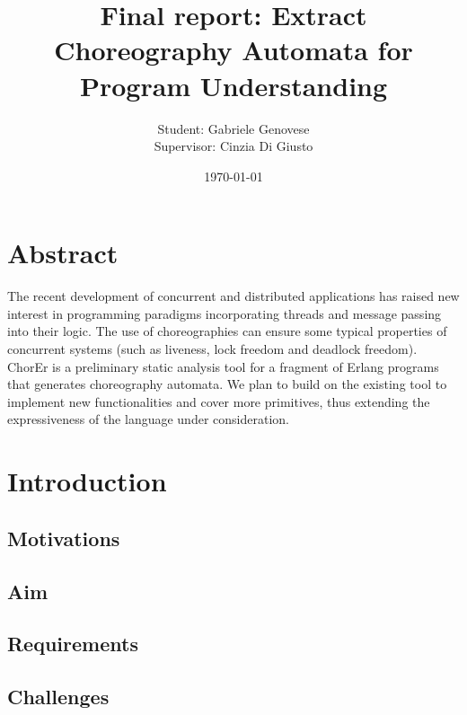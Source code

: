 \documentclass{article}
\title{Final report: Extract Choreography Automata for Program Understanding}
\author{Student: Gabriele Genovese\\Supervisor: Cinzia Di Giusto}
\date{\today}
\theoremstyle{definition}
\theoremstyle{definition}
\begin{document}
\maketitle


\section*{Abstract}
The recent development of concurrent and distributed applications has raised new interest in programming paradigms incorporating threads and message passing into their logic. The use of choreographies
can ensure some typical properties of concurrent systems (such as liveness, lock freedom and deadlock freedom). ChorEr is a preliminary static analysis tool for a fragment of Erlang programs that generates choreography automata. We plan to build on the existing tool to implement new functionalities and cover more primitives, thus extending the expressiveness of the language under consideration.

\newpage

\tableofcontents

\newpage

\section{Introduction}


\subsection{Motivations}


\subsection{Aim}


\subsection{Requirements}


\subsection{Challenges}


% 
\end{document}
